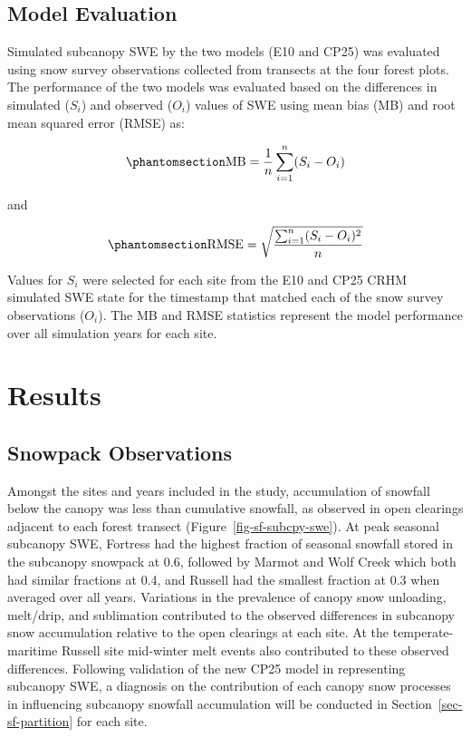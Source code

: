 \documentclass[
  letterpaper,
]{tex/uofsthesis-cs}
\begin{document}
\subsection{Model Evaluation}\label{model-evaluation}

Simulated subcanopy SWE by the two models (E10 and CP25) was evaluated
using snow survey observations collected from transects at the four
forest plots. The performance of the two models was evaluated based on
the differences in simulated (\(S_i\)) and observed (\(O_i\)) values of
SWE using mean bias (MB) and root mean squared error (RMSE) as:

\begin{equation}\phantomsection\label{eq-mb}{
\text{MB} = \frac{1}{n} \sum^n_{i=1}(S_i-O_i)
}\end{equation}

and

\begin{equation}\phantomsection\label{eq-rmse}{
\text{RMSE} = \sqrt{\frac{\sum^n_{i=1}(S_i-O_i)^2}{n}}
}\end{equation}

Values for \(S_i\) were selected for each site from the E10 and CP25
CRHM simulated SWE state for the timestamp that matched each of the snow
survey observations (\(O_i\)). The MB and RMSE statistics represent the
model performance over all simulation years for each site.

\section{Results}\label{results-2}

\subsection{Snowpack Observations}\label{snowpack-observations}

Amongst the sites and years included in the study, accumulation of
snowfall below the canopy was less than cumulative snowfall, as observed
in open clearings adjacent to each forest transect
(Figure~\ref{fig-sf-subcpy-swe}). At peak seasonal subcanopy SWE,
Fortress had the highest fraction of seasonal snowfall stored in the
subcanopy snowpack at 0.6, followed by Marmot and Wolf Creek which both
had similar fractions at 0.4, and Russell had the smallest fraction at
0.3 when averaged over all years. Variations in the prevalence of canopy
snow unloading, melt/drip, and sublimation contributed to the observed
differences in subcanopy snow accumulation relative to the open
clearings at each site. At the temperate-maritime Russell site
mid-winter melt events also contributed to these observed differences.
Following validation of the new CP25 model in representing subcanopy
SWE, a diagnosis on the contribution of each canopy snow processes in
influencing subcanopy snowfall accumulation will be conducted in
Section~\ref{sec-sf-partition} for each site.
\end{document}
